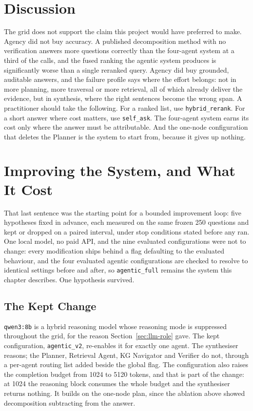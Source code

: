 \section{Discussion}
\label{sec:discussion}

The grid does not support the claim this project would have preferred to make.
Agency did not buy accuracy. A published decomposition method with no
verification answers more questions correctly than the four-agent system at a
third of the calls, and the fused ranking the agentic system produces is
significantly worse than a single reranked query. Agency did buy grounded,
auditable answers, and the failure profile says where the effort belongs: not
in more planning, more traversal or more retrieval, all of which already
deliver the evidence, but in synthesis, where the right sentences become the
wrong span. A practitioner should take the following. For a ranked list, use
\texttt{hybrid\_rerank}. For a short answer where cost matters, use
\texttt{self\_ask}. The four-agent system earns its cost only where the answer
must be attributable. And the one-node configuration that deletes the Planner
is the system to start from, because it gives up nothing.

\section{Improving the System, and What It Cost}
\label{sec:improvement}

That last sentence was the starting point for a bounded improvement loop:
five hypotheses fixed in advance, each measured on the same frozen 250
questions and kept or dropped on a paired interval, under stop conditions
stated before any ran. One local model, no paid API, and the nine evaluated
configurations were not to change: every modification ships behind a flag
defaulting to the evaluated behaviour, and the four evaluated agentic
configurations are checked to resolve to identical settings before and after,
so \texttt{agentic\_full} remains the system this chapter describes. One
hypothesis survived.

\subsection{The Kept Change}

\texttt{qwen3:8b} is a hybrid reasoning model whose reasoning mode is
suppressed throughout the grid, for the reason Section~\ref{sec:llm-role}
gave. The kept configuration, \texttt{agentic\_v2}, re-enables it for exactly
one agent. The synthesiser reasons; the Planner, Retrieval Agent, KG Navigator
and Verifier do not, through a per-agent routing list added beside the global
flag. The configuration also raises the completion budget from 1024 to 5120
tokens, and that is part of the change: at 1024 the reasoning block consumes
the whole budget and the synthesiser returns nothing. It builds on the
one-node plan, since the ablation above showed decomposition subtracting from
the answer.


